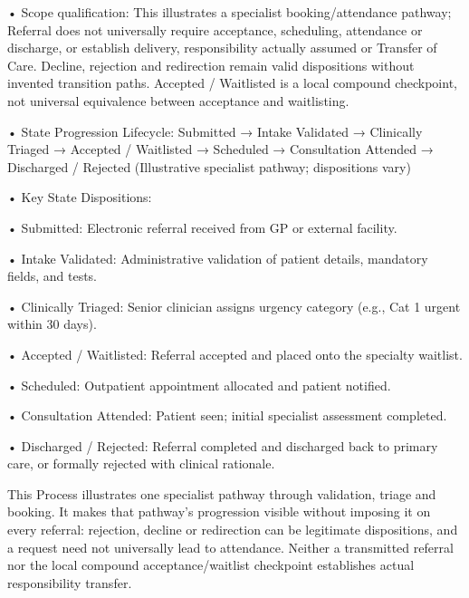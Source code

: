 •
Scope qualification: This illustrates a specialist booking/attendance pathway; Referral does not universally require acceptance, scheduling, attendance or discharge, or establish delivery, responsibility actually assumed or Transfer of Care. Decline, rejection and redirection remain valid dispositions without invented transition paths. Accepted / Waitlisted is a local compound checkpoint, not universal equivalence between acceptance and waitlisting.



•
State Progression Lifecycle: Submitted → Intake Validated → Clinically Triaged → Accepted / Waitlisted → Scheduled → Consultation Attended → Discharged / Rejected   (Illustrative specialist pathway; dispositions vary)



•
Key State Dispositions:



•
Submitted: Electronic referral received from GP or external facility.



•
Intake Validated: Administrative validation of patient details, mandatory fields, and tests.



•
Clinically Triaged: Senior clinician assigns urgency category (e.g., Cat 1 urgent within 30 days).



•
Accepted / Waitlisted: Referral accepted and placed onto the specialty waitlist.



•
Scheduled: Outpatient appointment allocated and patient notified.



•
Consultation Attended: Patient seen; initial specialist assessment completed.



•
Discharged / Rejected: Referral completed and discharged back to primary care, or formally rejected with clinical rationale.



This Process illustrates one specialist pathway through validation, triage and booking. It makes that pathway's progression visible without imposing it on every referral: rejection, decline or redirection can be legitimate dispositions, and a request need not universally lead to attendance. Neither a transmitted referral nor the local compound acceptance/waitlist checkpoint establishes actual responsibility transfer.


